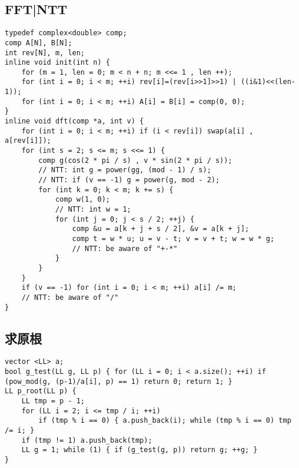 \documentclass[landscape,a4paper]{article}
\begin{document}
\subsection{FFT|NTT}

\begin{lstlisting}
typedef complex<double> comp;
comp A[N], B[N];
int rev[N], m, len;
inline void init(int n) {
	for (m = 1, len = 0; m < n + n; m <<= 1 , len ++);
	for (int i = 0; i < m; ++i) rev[i]=(rev[i>>1]>>1) | ((i&1)<<(len-1));
	for (int i = 0; i < m; ++i) A[i] = B[i] = comp(0, 0);
}
inline void dft(comp *a, int v) {
	for (int i = 0; i < m; ++i) if (i < rev[i]) swap(a[i] , a[rev[i]]);
	for (int s = 2; s <= m; s <<= 1) {
		comp g(cos(2 * pi / s) , v * sin(2 * pi / s));
		// NTT: int g = power(gg, (mod - 1) / s);
		// NTT: if (v == -1) g = power(g, mod - 2);
		for (int k = 0; k < m; k += s) {
			comp w(1, 0);
			// NTT: int w = 1;
			for (int j = 0; j < s / 2; ++j) {
				comp &u = a[k + j + s / 2], &v = a[k + j];
				comp t = w * u; u = v - t; v = v + t; w = w * g;
				// NTT: be aware of "+-*"
			}
		}
	}
	if (v == -1) for (int i = 0; i < m; ++i) a[i] /= m;
	// NTT: be aware of "/"
}
\end{lstlisting}

\subsection{求原根}
\begin{lstlisting}
vector <LL> a;
bool g_test(LL g, LL p) { for (LL i = 0; i < a.size(); ++i) if (pow_mod(g, (p-1)/a[i], p) == 1) return 0; return 1; }
LL p_root(LL p) {
	LL tmp = p - 1;
	for (LL i = 2; i <= tmp / i; ++i)
		if (tmp % i == 0) { a.push_back(i); while (tmp % i == 0) tmp /= i; }
	if (tmp != 1) a.push_back(tmp);
	LL g = 1; while (1) { if (g_test(g, p)) return g; ++g; }
}
\end{lstlisting}
\end{document}
